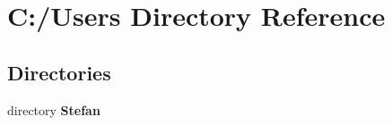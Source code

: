 \section{C\-:/\-Users Directory Reference}
\label{dir_8ceffd4ee35c3518d4e8bdc7e638efe8}
\subsection*{Directories}
\begin{DoxyCompactItemize}
\item 
directory {\bf Stefan}
\end{DoxyCompactItemize}
